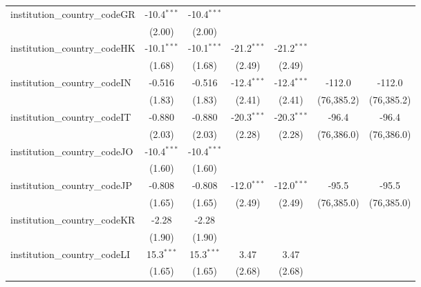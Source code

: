\begin{tabular}{lcccccc}
   institution\_country\_codeGR          & -10.4$^{***}$ & -10.4$^{***}$ &               &               &              &   \\   
                                         & (2.00)        & (2.00)        &               &               &              &   \\   
   institution\_country\_codeHK          & -10.1$^{***}$ & -10.1$^{***}$ & -21.2$^{***}$ & -21.2$^{***}$ &              &   \\   
                                         & (1.68)        & (1.68)        & (2.49)        & (2.49)        &              &   \\   
   institution\_country\_codeIN          & -0.516        & -0.516        & -12.4$^{***}$ & -12.4$^{***}$ & -112.0       & -112.0\\   
                                         & (1.83)        & (1.83)        & (2.41)        & (2.41)        & (76,385.2)   & (76,385.2)\\   
   institution\_country\_codeIT          & -0.880        & -0.880        & -20.3$^{***}$ & -20.3$^{***}$ & -96.4        & -96.4\\   
                                         & (2.03)        & (2.03)        & (2.28)        & (2.28)        & (76,386.0)   & (76,386.0)\\   
   institution\_country\_codeJO          & -10.4$^{***}$ & -10.4$^{***}$ &               &               &              &   \\   
                                         & (1.60)        & (1.60)        &               &               &              &   \\   
   institution\_country\_codeJP          & -0.808        & -0.808        & -12.0$^{***}$ & -12.0$^{***}$ & -95.5        & -95.5\\   
                                         & (1.65)        & (1.65)        & (2.49)        & (2.49)        & (76,385.0)   & (76,385.0)\\   
   institution\_country\_codeKR          & -2.28         & -2.28         &               &               &              &   \\   
                                         & (1.90)        & (1.90)        &               &               &              &   \\   
   institution\_country\_codeLI          & 15.3$^{***}$  & 15.3$^{***}$  & 3.47          & 3.47          &              &   \\   
                                         & (1.65)        & (1.65)        & (2.68)        & (2.68)        &              &   \\   

\end{tabular}
